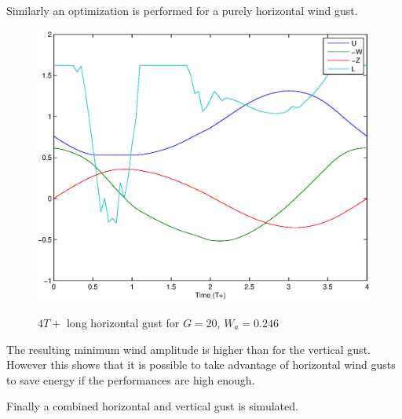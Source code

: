     \par Similarly an optimization is performed for a purely horizontal wind gust.

    \begin{figure}[h]
      \begin{center}
	\scalebox{0.8}
	{\includegraphics{./Figures/Windtype=2_Tg=4_Wg=0p246_quad_G=20.eps}}
      \end{center}
      \caption{$4T+$ long horizontal gust for $G=20$, $W_a=0.246$}
      \label{fig:Horizontal_optimization}
    \end{figure}

    The resulting minimum wind amplitude is higher than for the vertical gust. 
    However this shows that it is possible to take advantage of horizontal wind gusts to save energy if the performances are high enough.

    \par Finally a combined horizontal and vertical gust is simulated.

